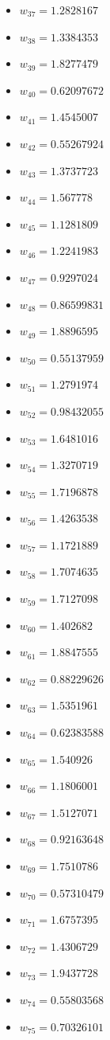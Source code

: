 \documentclass[11pt]{article}
\begin{document}
\begin{itemize}
\item $w_{37} = 1.2828167$
\item $w_{38} = 1.3384353$
\item $w_{39} = 1.8277479$
\item $w_{40} = 0.62097672$
\item $w_{41} = 1.4545007$
\item $w_{42} = 0.55267924$
\item $w_{43} = 1.3737723$
\item $w_{44} = 1.567778$
\item $w_{45} = 1.1281809$
\item $w_{46} = 1.2241983$
\item $w_{47} = 0.9297024$
\item $w_{48} = 0.86599831$
\item $w_{49} = 1.8896595$
\item $w_{50} = 0.55137959$
\item $w_{51} = 1.2791974$
\item $w_{52} = 0.98432055$
\item $w_{53} = 1.6481016$
\item $w_{54} = 1.3270719$
\item $w_{55} = 1.7196878$
\item $w_{56} = 1.4263538$
\item $w_{57} = 1.1721889$
\item $w_{58} = 1.7074635$
\item $w_{59} = 1.7127098$
\item $w_{60} = 1.402682$
\item $w_{61} = 1.8847555$
\item $w_{62} = 0.88229626$
\item $w_{63} = 1.5351961$
\item $w_{64} = 0.62383588$
\item $w_{65} = 1.540926$
\item $w_{66} = 1.1806001$
\item $w_{67} = 1.5127071$
\item $w_{68} = 0.92163648$
\item $w_{69} = 1.7510786$
\item $w_{70} = 0.57310479$
\item $w_{71} = 1.6757395$
\item $w_{72} = 1.4306729$
\item $w_{73} = 1.9437728$
\item $w_{74} = 0.55803568$
\item $w_{75} = 0.70326101$

\end{itemize}
\end{document}

